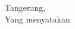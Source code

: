 \begin{flushright}
Tangerang, \tanggalPengumpulan \\
Yang menyatakan\\[2.5cm]
\noindent
\penulis
\end{flushright}


\vfill


\onehalfspacing
\newpage